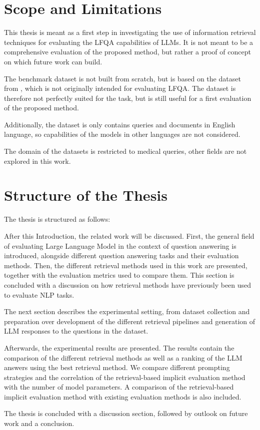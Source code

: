 \section{Scope and Limitations}\label{sec:scope-and-limitations}
This thesis is meant as a first step in investigating the use of information retrieval techniques for evaluating the LFQA capabilities of LLMs.
It is not meant to be a comprehensive evaluation of the proposed method, but rather a proof of concept on which future work can build.

The benchmark dataset is not built from scratch, but is based on the dataset from \cite{goeuriot:2021:Consumer}, which is not originally intended for evaluating LFQA.
The dataset is therefore not perfectly suited for the task, but is still useful for a first evaluation of the proposed method.

Additionally, the dataset is only contains queries and documents in English language, so capabilities of the models in other languages are not considered.

The domain of the datasets is restricted to medical queries, other fields are not explored in this work.

\section{Structure of the Thesis}\label{sec:structure-of-the-thesis}
The thesis is structured as follows:

After this Introduction, the related work will be discussed.
First, the general field of evaluating Large Language Model in the context of question answering is introduced, alongside different question answering tasks and their evaluation methods.
Then, the different retrieval methods used in this work are presented, together with the evaluation metrics used to compare them.
This section is concluded with a discussion on how retrieval methods have previously been used to evaluate NLP tasks.

The next section describes the experimental setting, from dataset collection and preparation over development of the different retrieval pipelines and generation of LLM responses to the questions in the dataset.

Afterwards, the experimental results are presented.
The results contain the comparison of the different retrieval methods as well as a ranking of the LLM answers using the best retrieval method.
We compare different prompting strategies and the correlation of the retrieval-based implicit evaluation method with the number of model parameters.
A comparison of the retrieval-based implicit evaluation method with existing evaluation methods is also included.

The thesis is concluded with a discussion section, followed by outlook on future work and a conclusion.